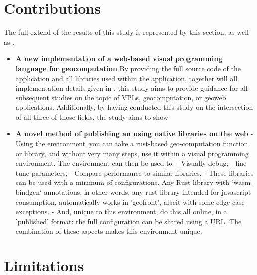 \section{Contributions}
\label{sec:contribution}
The full extend of the results of this study is represented by this section, as well as .

\begin{itemize}[-]
  \item \textbf{A new implementation of a web-based visual programming language for geocomputation}
    By providing the full source code of the application and all libraries used within the application, together will all implementation details given in , this study aims to provide guidance for all subsequent studies on the topic of VPLs, geocomputation, or geoweb applications. 
    Additionally, by having conducted this study on the intersection of all three of those fields, the study aims to show 
  
  \item \textbf{A novel method of publishing an using native libraries on the web}
    - Using the environment, you can take a rust-based geo-computation function or library, 
    and without very many steps, use it within a visual programming environment. 
    The environment can then be used to:
    - Visually debug, 
    - fine tune parameters, 
    - Compare performance to similar libraries,
    - These libraries can be used with a minimum of configurations. Any Rust library with `wasm-bindgen` annotations, in other words, any rust library intended for javascript consumption, automatically works in 'geofront', albeit with some edge-case exceptions. 
    - And, unique to this environment, do this all online, in a 'published' format: the full configuration can be shared using a URL.
    The combination of these aspects makes this environment unique. 
    
    
\end{itemize}

\section{Limitations}
\label{sec:limitations}

